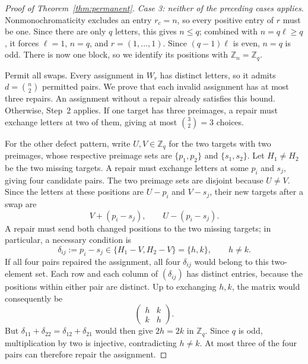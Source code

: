 \documentclass[11pt,a4paper]{article}
\numberwithin{equation}{section}
\numberwithin{figure}{section}
\numberwithin{table}{section}
\numberwithin{footnote}{section}
\theoremstyle{informal}\newtheorem*{informaltheorem}{Informal theorem}
\theoremstyle{definition}\newtheorem{example}{Example}[section]
\theoremstyle{remark}\newtheorem{remark}[theorem]{Remark}
\newcommand{\Z}{\mathbb Z}
\begin{document}
\begin{proof}[Proof of Theorem~\ref{thm:permanent}]
\emph{Case 3: neither of the preceding cases applies.}
Nonmonochromaticity excludes an entry \(r_c=n\), so every positive
entry of \(r\) must be one. Since there are only \(q\) letters,
this gives \(n\leq q\); combined with \(n=q\ell\geq q\), it
forces \(\ell=1\), \(n=q\), and
\(r=(1,\ldots,1)\). Since \((q-1)\ell\) is even, \(n=q\)
is odd. There is now one block, so we identify its positions with
\(\Z_n=\Z_q\).

Permit all swaps. Every assignment in \(W_r\) has distinct letters,
so it admits \(d=\binom n2\) permitted pairs. We prove that each
invalid assignment has at most three repairs. An assignment without
a repair already satisfies this bound. Otherwise, Step~2 applies.
If one target has three preimages, a repair must exchange letters
at two of them, giving at most \(\binom32=3\) choices.

For the other defect pattern, write \(U,V\in\Z_q\) for the
two targets with two preimages, whose respective preimage sets are
\(\{p_1,p_2\}\) and \(\{s_1,s_2\}\). Let \(H_1\ne H_2\)
be the two missing targets. A repair must exchange letters at some
\(p_i\) and \(s_j\), giving four candidate pairs. The two
preimage sets are disjoint because \(U\ne V\). Since the letters at these positions
are \(U-p_i\) and \(V-s_j\), their new targets after a swap are
\begin{equation}
 V+(p_i-s_j),\qquad U-(p_i-s_j).
\end{equation}
A repair must send both changed positions to the two missing targets;
in particular, a necessary condition is
\begin{equation}
 \delta_{ij}:=p_i-s_j\in
 \{H_1-V,H_2-V\}=\{h,k\},\qquad h\ne k.
\end{equation}
If all four pairs repaired the assignment, all four \(\delta_{ij}\)
would belong to this two-element set. Each row and each column of
\((\delta_{ij})\) has distinct entries, because the positions within
either pair are distinct. Up to exchanging \(h,k\), the matrix
would consequently be
\begin{equation}
 \begin{pmatrix}h&k\\k&h\end{pmatrix}.
\end{equation}
But
\(\delta_{11}+\delta_{22}=\delta_{12}+\delta_{21}\)
would then give \(2h=2k\) in \(\Z_q\).
Since \(q\) is odd, multiplication by two is injective, contradicting
\(h\ne k\). At most three of the four pairs can therefore repair the
assignment.


\end{proof}
\end{document}
